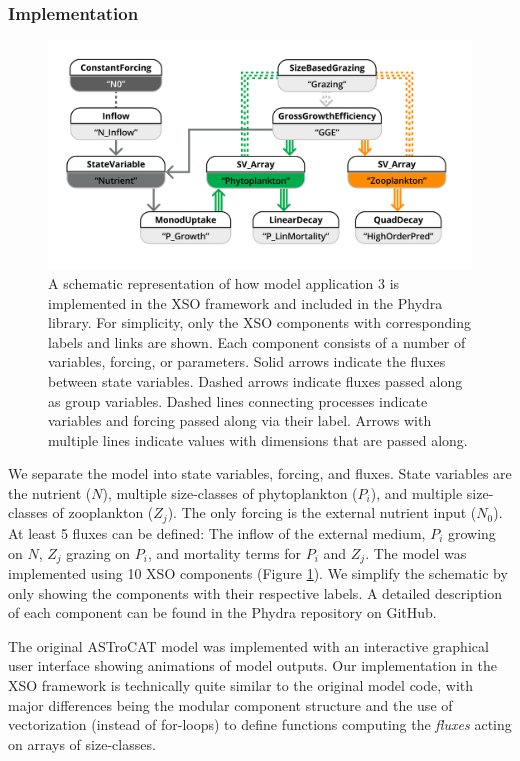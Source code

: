 \documentclass[journal abbreviation, manuscript]{copernicus}
\begin{document}
\subsubsection{Implementation}
\begin{figure}[t]
\includegraphics[width=15cm]{Figures/firstdraft_schematics/code_schematics/ASTroCAT.pdf}
\caption{A schematic representation of how model application 3 is implemented in the XSO framework and included in the Phydra library. For simplicity, only the XSO components with corresponding labels and links are shown. Each component consists of a number of variables, forcing, or parameters. Solid arrows indicate the fluxes between state variables. Dashed arrows indicate fluxes passed along as group variables. Dashed lines connecting processes indicate variables and forcing passed along via their label. Arrows with multiple lines indicate values with dimensions that are passed along.}
\label{Figure:CodeSchematics_3}
\end{figure}

We separate the model into state variables, forcing, and fluxes. State variables are the nutrient ($N$), multiple size-classes of phytoplankton ($P_i$), and multiple size-classes of zooplankton ($Z_j$). The only forcing is the external nutrient input ($N_0$). At least 5 fluxes can be defined: The inflow of the external medium, $P_i$ growing on $N$, $Z_j$ grazing on $P_i$, and mortality terms for $P_i$ and $Z_j$.
The model was implemented using 10 XSO components (Figure \ref{Figure:CodeSchematics_3}). We simplify the schematic by only showing the components with their respective labels. A detailed description of each component can be found in the Phydra repository on GitHub.

The original ASTroCAT model was implemented with an interactive graphical user interface showing animations of model outputs. Our implementation in the XSO framework is technically quite similar to the original model code, with major differences being the modular component structure and the use of vectorization (instead of for-loops) to define functions computing the \textit{fluxes} acting on arrays of size-classes.
\end{document}
